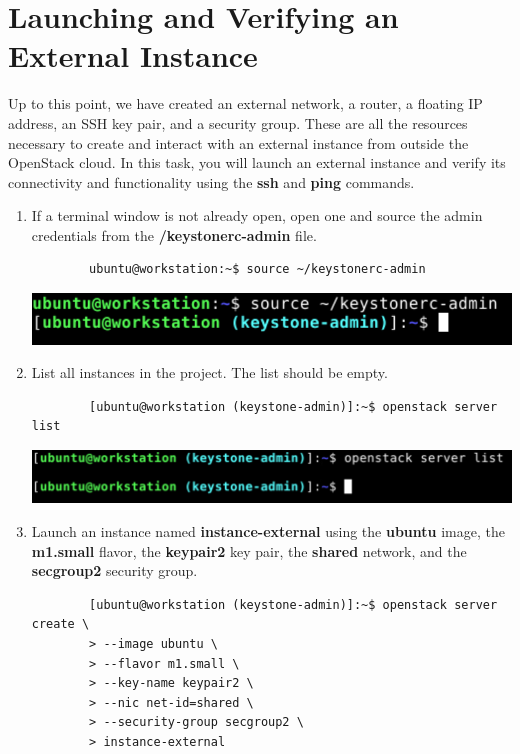 \documentclass[letterpaper, 12pt]{article}
\begin{document}
\section{Launching and Verifying an External Instance}
\label{sec:launching_an_external_isntance}
Up to this point, we have created an external network, a router, a floating IP address, an SSH key pair, and a security group.
These are all the resources necessary to create and interact with an external instance from outside the OpenStack cloud.
In this task, you will launch an external instance and verify its connectivity and functionality using the \textbf{ssh} and \textbf{ping} commands.

\begin{enumerate}
    \item If a terminal window is not already open, open one and source the admin credentials from the \textbf{\texttildemid/keystonerc-admin} file.
    \begin{lstlisting}
        ubuntu@workstation:~$ source ~/keystonerc-admin
    \end{lstlisting}

    \begin{center}
        \includegraphics[width=\linewidth]{images/part6/step1.png}
    \end{center}

    \item List all instances in the project.
    The list should be empty.
    \begin{lstlisting}
        [ubuntu@workstation (keystone-admin)]:~$ openstack server list
    \end{lstlisting}

    \begin{center}
        \includegraphics[width=\linewidth]{images/part6/step2.png}
    \end{center}

    \item Launch an instance named \textbf{instance-external} using the \textbf{ubuntu} image, the \textbf{m1.small} flavor, the \textbf{keypair2} key pair, the \textbf{shared} network, and the \textbf{secgroup2} security group.
    \begin{lstlisting}
        [ubuntu@workstation (keystone-admin)]:~$ openstack server create \
        > --image ubuntu \
        > --flavor m1.small \
        > --key-name keypair2 \
        > --nic net-id=shared \
        > --security-group secgroup2 \
        > instance-external
    \end{lstlisting}


\end{enumerate}
\end{document}
